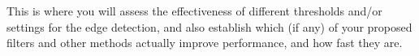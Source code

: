 This is where you will assess the effectiveness of different thresholds and/or settings for the edge detection, and also establish which (if any) of your proposed filters and other methods actually improve performance, and how fast they are.